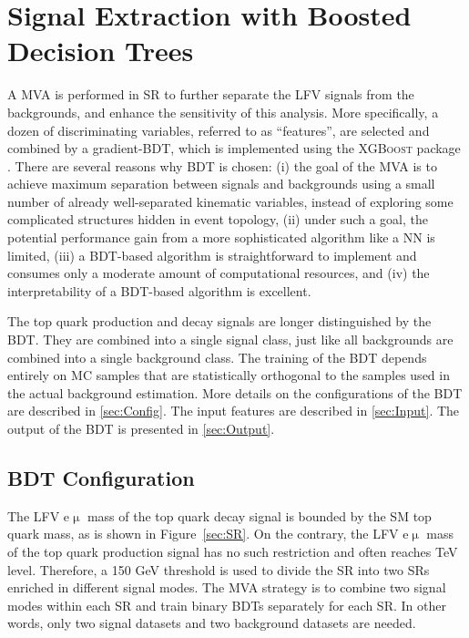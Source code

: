 \chapter{Signal Extraction with Boosted Decision Trees}
\label{chap:BDT}

A \ac{MVA} is performed in \ac{SR} to further separate the LFV signals from the backgrounds, and enhance the sensitivity of this analysis. More specifically, a dozen of discriminating variables, referred to as ``features'', are selected and combined by a gradient-\ac{BDT}, which is implemented using the \textsc{XGBoost} package \cite{Chen:2016:XST:2939672.2939785}. There are several reasons why \ac{BDT} is chosen: (i) the goal of the \ac{MVA} is to achieve maximum separation between signals and backgrounds using a small number of already well-separated kinematic variables, instead of exploring some complicated structures hidden in event topology, (ii) under such a goal, the potential performance gain from a more sophisticated algorithm like a \ac{NN} is limited, (iii) a \ac{BDT}-based algorithm is straightforward to implement and consumes only a moderate amount of computational resources, and (iv) the interpretability of a \ac{BDT}-based algorithm is excellent. 

The top quark production and decay signals are longer distinguished by the \ac{BDT}. They are combined into a single signal class, just like all backgrounds are combined into a single background class. The training of the \ac{BDT} depends entirely on \ac{MC} samples that are statistically orthogonal to the samples used in the actual background estimation. More details on the configurations of the \ac{BDT} are described in \autoref{sec:Config}. The input features are described in \autoref{sec:Input}. The output of the \ac{BDT} is presented in \autoref{sec:Output}.

\section{BDT Configuration}
\label{sec:Config}

The LFV e$\upmu$ mass of the top quark decay signal is bounded by the \ac{SM} top quark mass, as is shown in Figure~\ref{sec:SR}. On the contrary, the LFV e$\upmu$ mass of the top quark production signal has no such restriction and often reaches TeV level. Therefore, a 150 GeV threshold is used to divide the \ac{SR} into two \acp{SR} enriched in different signal modes. The \ac{MVA} strategy is to combine two signal modes within each \ac{SR} and train binary \acp{BDT} separately for each \ac{SR}. In other words, only two signal datasets and two background datasets are needed.
  
